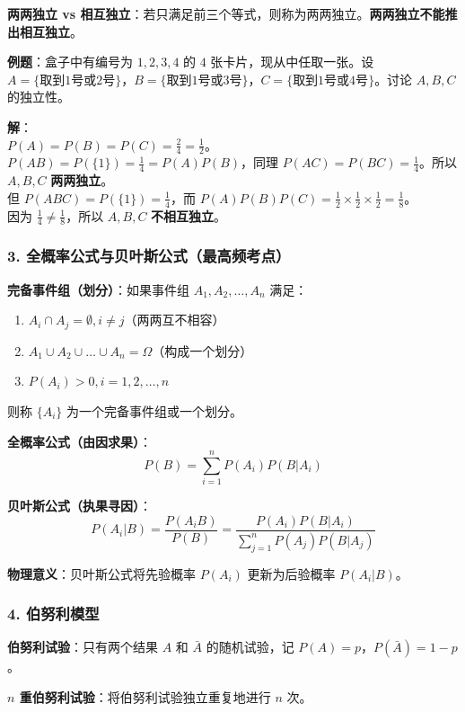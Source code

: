 \documentclass[12pt,a4paper]{ctexart}
\begin{document}
\textbf{两两独立 vs 相互独立}：若只满足前三个等式，则称为两两独立。\textbf{两两独立不能推出相互独立}。

\textbf{例题}：盒子中有编号为 $1,2,3,4$ 的 $4$ 张卡片，现从中任取一张。设 $A=\{\text{取到1号或2号}\}$，$B=\{\text{取到1号或3号}\}$，$C=\{\text{取到1号或4号}\}$。讨论 $A,B,C$ 的独立性。

\textbf{解}：\\
$P(A) = P(B) = P(C) = \frac{2}{4} = \frac{1}{2}$。\\
$P(AB) = P(\{1\}) = \frac{1}{4} = P(A)P(B)$，同理 $P(AC)=P(BC)=\frac{1}{4}$。所以 $A, B, C$ \textbf{两两独立}。\\
但 $P(ABC) = P(\{1\}) = \frac{1}{4}$，而 $P(A)P(B)P(C) = \frac{1}{2} \times \frac{1}{2} \times \frac{1}{2} = \frac{1}{8}$。\\
因为 $\frac{1}{4} \ne \frac{1}{8}$，所以 $A, B, C$ \textbf{不相互独立}。

\subsubsection{3. 全概率公式与贝叶斯公式（最高频考点）}

\textbf{完备事件组（划分）}：如果事件组 $A_1, A_2, \dots, A_n$ 满足：
\begin{enumerate}[noitemsep]
    \item $A_i \cap A_j = \emptyset, i \ne j$（两两互不相容）
    \item $A_1 \cup A_2 \cup \dots \cup A_n = \Omega$（构成一个划分）
    \item $P(A_i) > 0, i = 1,2,\dots,n$
\end{enumerate}
则称 $\{A_i\}$ 为一个完备事件组或一个划分。

\textbf{全概率公式（由因求果）}：
\[ P(B) = \sum_{i=1}^n P(A_i) P(B|A_i) \]

\textbf{贝叶斯公式（执果寻因）}：
\[ P(A_i|B) = \frac{P(A_i B)}{P(B)} = \frac{P(A_i) P(B|A_i)}{\sum_{j=1}^n P(A_j) P(B|A_j)} \]

\textbf{物理意义}：贝叶斯公式将先验概率 $P(A_i)$ 更新为后验概率 $P(A_i|B)$。

\subsubsection{4. 伯努利模型}
\textbf{伯努利试验}：只有两个结果 $A$ 和 $\bar{A}$ 的随机试验，记 $P(A) = p$，$P(\bar{A}) = 1-p$。

\textbf{$n$ 重伯努利试验}：将伯努利试验独立重复地进行 $n$ 次。
\end{document}
